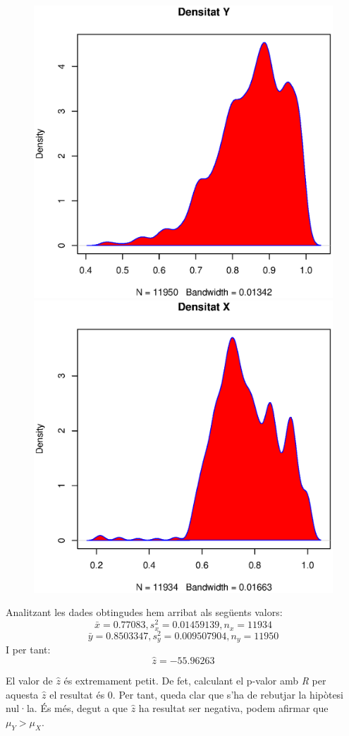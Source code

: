 \begin{figure}[h!]
\begin{minipage}{0.5\linewidth}
\includegraphics[width=1\linewidth]{./images/no_DENS.eps}
\caption{}
\end{minipage}
\hfill
\begin{minipage}{0.5\linewidth}
\includegraphics[width=1\linewidth]{./images/si_DENS.eps}
\caption{}
\end{minipage}
\end{figure}
Analitzant les dades obtingudes hem arribat als següents valors:
$$\bar{x} = 0.77083, s^2_x = 0.01459139, n_x = 11934$$
$$\bar{y} = 0.8503347, s^2_y = 0.009507904, n_y = 11950$$
I per tant:
$$\hat{z} = -55.96263$$


El valor de $\hat{z}$ és extremament petit. De fet, calculant el p-valor amb \emph{R} per aquesta $\hat{z}$ el resultat és 0. Per tant, queda clar que s'ha de rebutjar la hipòtesi nul·la. És més, degut a que $\hat{z}$ ha resultat ser negativa, podem afirmar que $\mu_Y > \mu_X$.